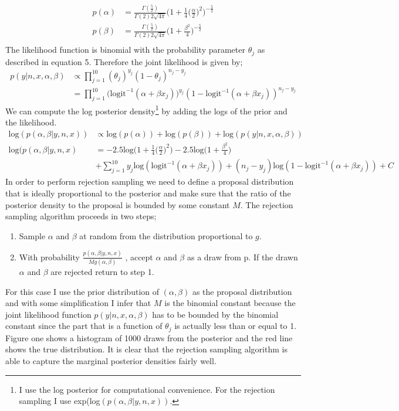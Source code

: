 \documentclass{article}
\begin{document}
\begin{align*}
\displaystyle
p(\alpha) & = \frac{\Gamma(\frac{5}{2})}{\Gamma(2)2\sqrt{4\pi}} \bigg(1 + \frac{1}{4}\bigg(\frac{\alpha}{2}\bigg)^2\bigg)^{-\frac{5}{2}} \\
p(\beta) & = \frac{\Gamma(\frac{5}{2})}{\Gamma(2)2\sqrt{4\pi}} \bigg(1 + \frac{\beta^2}{4}\bigg)^{-\frac{5}{2}}\\
\end{align*}
The likelihood function is binomial with the probability parameter $\theta_j$ as described in equation 5. Therefore the joint likelihood is given by;
\begin{align*}
\displaystyle
p(y | n, x, \alpha, \beta) &\propto \prod_{j=1}^{10}(\theta_j)^{y_j} (1 - \theta_j) ^{n_j - y_j}  \\ 
&=\prod_{j=1}^{10}\text{(logit}^{-1}(\alpha + \beta x_j))^{y_j}(1 - \text{logit}^{-1}(\alpha + \beta x_j))^{n_j - y_j}
\end{align*}
We can compute the log posterior density\footnote{I use the log posterior for computational convenience. For the rejection sampling I use exp(log$(p(\alpha, \beta |y, n, x))$.} by adding the logs of the prior and the likelihood.
\begin{align*}
\text{log}(p(\alpha,\beta | y, n, x)) &\propto \text{log}(p(\alpha)) + \text{log}(p(\beta)) + \text{log}(p(y | n, x, \alpha, \beta))\\
\text{log}(p(\alpha, \beta |y, n, x) &= -2.5\text{log}\bigg(1 + \frac{1}{4}\bigg(\frac{\alpha}{2}\bigg)^2\bigg) - 2.5\text{log}\bigg(1 + \frac{\beta^2}{4}\bigg) \\ &+ \sum_{j=1}^{10}  y_j \text{log}(\text{logit}^{-1}(\alpha + \beta x_j)) + (n_j - y_j)\text{log}(1 - \text{logit}^{-1}(\alpha + \beta x_j)) + C
\end{align*}
In order to perform rejection sampling we need to define a proposal distribution that is ideally proportional to the posterior and make sure that the ratio of the posterior density to the proposal is bounded by some constant $M$. The rejection sampling algorithm proceeds in two steps;
\begin{enumerate}
\item{Sample $\alpha$ and  $\beta$ at random from the distribution proportional to $g$.}
\item{With probability $\frac{p(\alpha, \beta | y, n, x)}{Mg(\alpha, \beta)}$ , accept $\alpha$ and $\beta$  as a draw from p. If the drawn $\alpha$ and $\beta$ are rejected return to step 1.}
\end{enumerate}
For this case I use the prior distribution of $(\alpha,\beta)$ as the proposal distribution and with some simplification I infer that $M$ is the binomial constant because the joint likelihood function $p(y | n, x, \alpha, \beta)$ has to be bounded by the binomial constant since the part that is a function of $\theta_j$ is actually less than or equal to 1.
Figure one shows a histogram of 1000 draws from the posterior and the red line shows the true distribution. It is clear that the rejection sampling algorithm is able to capture the marginal posterior densities fairly well.
\end{document}
